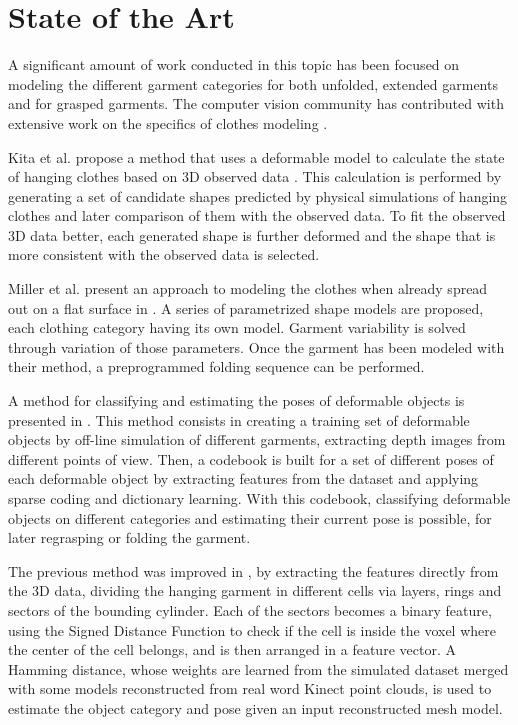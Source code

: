 \chapter{State of the Art}
\label{state_of_the_art}


A significant amount of work conducted in this topic has been focused on modeling the different garment categories for both unfolded, extended garments and for grasped garments. The computer vision community has contributed with extensive work on the specifics of clothes modeling \cite{Chen2009}. 

Kita et al. propose a method that uses a deformable model to calculate the state of hanging clothes based on 3D observed data \cite{Kita2004, Kita2009}. This calculation is performed by generating a set of candidate shapes predicted by physical simulations of hanging clothes and later comparison of them with the observed data. To fit the observed 3D data better, each generated shape is further deformed and the shape that is more consistent with the observed data is selected. 

Miller et al. present an approach to modeling the clothes when already spread out on a flat surface in \cite{Miller2011}. A series of parametrized shape models are proposed, each clothing category having its own model. Garment variability is solved through variation of those parameters. Once the garment has been modeled with their method, a preprogrammed folding sequence can be performed.

A method for classifying and estimating the poses of deformable objects is presented in \cite{Li2014ICRA}. This method consists in creating a training set of deformable objects by off-line simulation of different garments, extracting depth images from different points of view. Then, a codebook is built for a set of different poses of each deformable object by extracting features from the dataset and applying sparse coding and dictionary learning. With this codebook, classifying deformable objects on different categories and estimating their current pose is possible, for later regrasping or folding the garment.

The previous method was improved in \cite{Li2014IROS}, by extracting the features directly from the 3D data, dividing the hanging garment in different cells via layers, rings and sectors of the bounding cylinder. Each of the sectors becomes a binary feature, using the Signed Distance Function to check if the cell is inside the voxel where the center of the cell belongs, and is then arranged in a feature vector. A Hamming distance, whose weights are learned from the simulated dataset merged with some models reconstructed from real word Kinect point clouds, is used to estimate the object category and pose given an input reconstructed mesh model.

